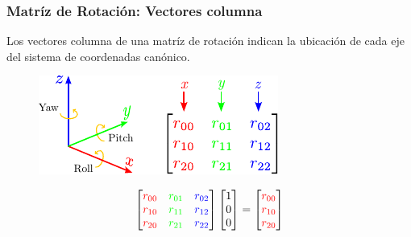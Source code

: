 \begin{frame}
    \frametitle{Matríz de Rotación: Vectores columna}

    Los vectores columna de una matríz de rotación indican la ubicación de cada eje del sistema de coordenadas canónico.

    \begin{figure}[!h]
        \includegraphics[width=0.5\columnwidth]{./images/rotation_matrix_column_vectors.pdf}
    \end{figure}

    \begin{equation*}
        \begin{bmatrix}
            \textcolor{red}{r_{00}} & \textcolor{green}{r_{01}} & \textcolor{blue}{r_{02}}\\
            \textcolor{red}{r_{10}} & \textcolor{green}{r_{11}} & \textcolor{blue}{r_{12}}\\
            \textcolor{red}{r_{20}} & \textcolor{green}{r_{21}} & \textcolor{blue}{r_{22}}
        \end{bmatrix}
        \begin{bmatrix}
            1\\
            0\\
            0
        \end{bmatrix} =
        \begin{bmatrix}
            \textcolor{red}{r_{00}}\\
            \textcolor{red}{r_{10}}\\
            \textcolor{red}{r_{20}}
        \end{bmatrix}
    \end{equation*}

\end{frame}


